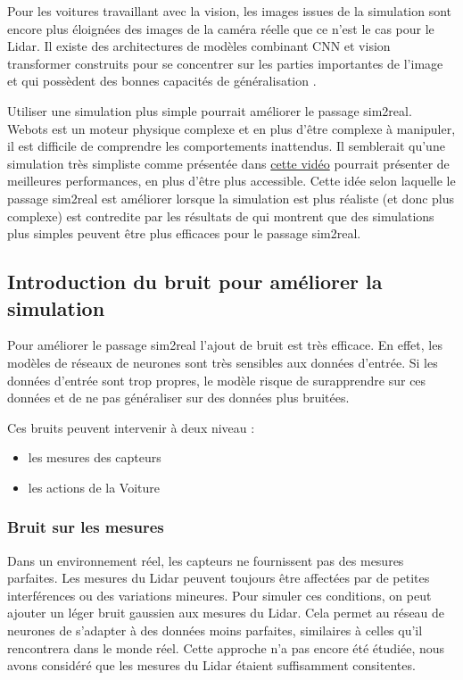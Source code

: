 \documentclass[french]{article}
\begin{document}
\vspace{0.5cm}

Pour les voitures travaillant avec la vision, les images issues de la simulation sont encore plus éloignées des images de la caméra réelle que ce n'est le cas pour le Lidar. Il existe des architectures de modèles combinant CNN et vision transformer construits pour se concentrer sur les parties importantes de l'image et qui possèdent des bonnes capacités de généralisation \cite{li2023style}.

\vspace{0.5cm}

Utiliser une simulation plus simple pourrait améliorer le passage sim2real. Webots est un moteur physique complexe et en plus d'être complexe à manipuler, il est difficile de comprendre les comportements inattendus. Il semblerait qu'une simulation très simpliste comme présentée dans \href{https://www.youtube.com/watch?v=Cy155O5R1Oo&list=PLg2V2juOLiPWxd5fQOz1la37etAf9_WoW&index=4}{cette vidéo} pourrait présenter de meilleures performances, en plus d'être plus accessible. Cette idée selon laquelle le passage sim2real est améliorer lorsque la simulation est plus réaliste (et donc plus complexe) est contredite par les résultats de \cite{pmlr-v205-truong23a} qui montrent que des simulations plus simples peuvent être plus efficaces pour le passage sim2real.

\subsection{Introduction du bruit pour améliorer la simulation}
Pour améliorer le passage sim2real l'ajout de bruit est très efficace. En effet, les modèles de réseaux de neurones sont très sensibles aux données d'entrée. Si les données d'entrée sont trop propres, le modèle risque de surapprendre sur ces données et de ne pas généraliser sur des données plus bruitées.\vspace{0.5cm}

Ces bruits peuvent intervenir à deux niveau :
\begin{itemize}
    \item les mesures des capteurs 
    \item les actions de la Voiture
\end{itemize}

\subsubsection{Bruit sur les mesures}
Dans un environnement réel, les capteurs ne fournissent pas des mesures parfaites. Les mesures du Lidar peuvent 
toujours être affectées par de petites interférences ou des variations mineures. Pour simuler ces conditions, 
on peut ajouter un léger bruit gaussien aux mesures du Lidar. Cela permet au réseau de neurones de s'adapter 
à des données moins parfaites, similaires à celles qu'il rencontrera dans le monde réel. Cette approche n'a pas encore été étudiée, nous avons considéré que les mesures du Lidar étaient suffisamment consitentes.
\end{document}
